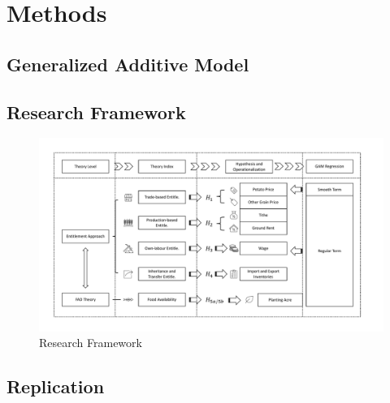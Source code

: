 \chapter{Methods}

\section{Generalized Additive Model}

\section{Research Framework}
\begin{landscape}
    \begin{figure}[htbp]
        \centering
        \caption{Research Framework}
        \includegraphics[width=1.5\textheight]{../03_outputs/Framework.pdf}
    \end{figure}
\end{landscape}

\section{Replication}
